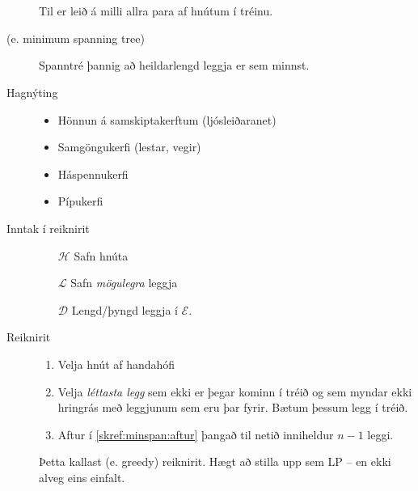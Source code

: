 \section{}
\begin{description}
 \item[  ] Til er leið á milli allra para af hnútum í tréinu.
 \item[  (e. minimum spanning tree)] Spanntré þannig að heildar\-lengd leggja er sem minnst.
 \item[Hagnýting]\hspace{.1cm}
\begin{itemize}
 \item Hönnun á samskiptakerftum (ljósleiðaranet)
 \item Samgöngukerfi (lestar, vegir)
 \item Háspennukerfi
 \item Pípukerfi
\end{itemize}
 \item[Inntak í reiknirit]\hspace{.1cm}
 \begin{enumerate}
  \item[$\mathcal{H}$] Safn hnúta
  \item[$\mathcal{L}$] Safn \emph{mögulegra} leggja
  \item[$\mathcal{D}$] Lengd/þyngd leggja í $\mathcal{E}$.
 \end{enumerate}
 \item[Reiknirit]\hspace{.1cm}
 \begin{enumerate}[label=Skref \arabic{*}]
  \item Velja hnút af handahófi 
  \item\label{skref:minspan:aftur} Velja \emph{léttasta legg} sem ekki er þegar kominn í tréið og sem myndar ekki hringrás með leggjunum sem eru þar fyrir. Bætum þessum legg í tréið.
  \item Aftur í \ref{skref:minspan:aftur} þangað til netið inniheldur $n-1$ leggi.
 \end{enumerate}
 \begin{aths}Þetta kallast  (e. greedy) reiknirit. Hægt að stilla upp sem LP -- en ekki alveg eins einfalt.\end{aths}
\end{description}

